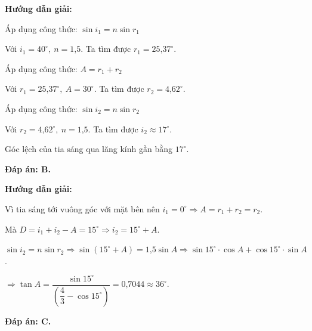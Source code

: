 {
	\begin{center}
		\textbf{Hướng dẫn giải:}
	\end{center}
	
	{Áp dụng công thức: $\sin i_1=n\sin r_1$
		
		Với $i_1=40^\circ,\ n=\text{1,5} $. Ta tìm được $r_1=\text{25,37}^\circ$.
		
		Áp dụng công thức: $A=r_1+r_2$
		
		Với $r_1=\text{25,37}^\circ,\ A=30^\circ$. Ta tìm được $r_2=\text{4,62}^\circ$.
		
		Áp dụng công thức: $\sin i_2=n\sin r_2$
		
		Với $r_2=\text{4,62}^\circ,\ n=\text{1,5} $. Ta tìm được $i_2\approx \text{17}^\circ$.
		
	Góc lệch của tia sáng qua lăng kính gần bằng $\text{17}^\circ$.
		
		\textbf{Đáp án: B.}
		
		
	}}

{
\begin{center}
	\textbf{Hướng dẫn giải:}
\end{center}

 Vì tia sáng tới vuông góc với mặt bên nên $i_1=0^\circ \Rightarrow A=r_1+r_2=r_2$.
	
	Mà $D=i_1+i_2-A=15^\circ \Rightarrow i_2=15^\circ+A$.
	
	$\sin i_2=n\sin r_2 \Rightarrow \sin\left( 15^\circ+A\right)=\text{1,5}\sin A \Rightarrow \sin 15^\circ\cdot \cos A+\cos 15^\circ\cdot \sin A$.
	
	$\Rightarrow \tan A=\dfrac{\sin 15^\circ}{\left( \dfrac{4}{3}-\cos15^\circ \right) }=\text{0,7044}\approx 36^\circ$.
	
\textbf{	Đáp án: C.}
	
	
}


